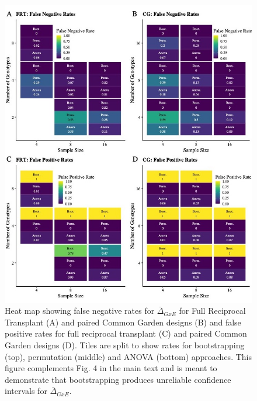 \documentclass[11pt, oneside]{amsart}
\begin{document}
\clearpage
\newpage
\renewcommand\thefigure{S5}
\begin{figure}[h]
\begin{center}
\includegraphics[width=6in]{Figs/GxE_Panel.jpg}
\end{center}
\label{Fig: }
\caption[Heat map showing false negative rates for $\bar\Delta_{GxE}$ for Full Reciprocal Transplant (A) and paired Common Garden designs (B) and false positive rates for full reciprocal transplant (C) and paired Common Garden designs (D). ] {Heat map showing false negative rates for $\bar\Delta_{GxE}$ for Full Reciprocal Transplant (A) and paired Common Garden designs (B) and false positive rates for full reciprocal transplant (C) and paired Common Garden designs (D). Tiles are split to show rates for bootstrapping (top), permutation (middle) and ANOVA (bottom) approaches. This figure complements Fig. 4 in the main text and is meant to demonstrate that bootstrapping produces unreliable confidence intervals for  $\bar\Delta_{GxE}$. }

\end{figure}

\clearpage
\newpage
\end{document}
